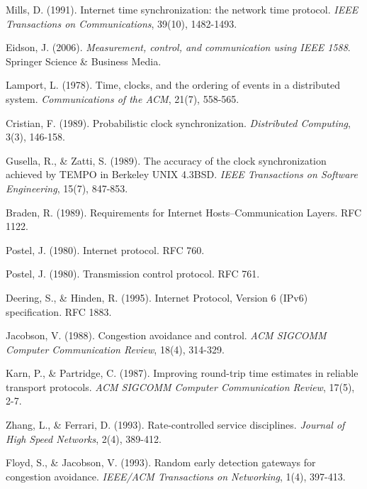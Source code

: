 \documentclass[12pt,a4paper]{article}
\begin{document}

\begin{thebibliography}{99}

Mills, D. (1991). Internet time synchronization: the network time protocol. \textit{IEEE Transactions on Communications}, 39(10), 1482-1493.

Eidson, J. (2006). \textit{Measurement, control, and communication using IEEE 1588}. Springer Science \& Business Media.

Lamport, L. (1978). Time, clocks, and the ordering of events in a distributed system. \textit{Communications of the ACM}, 21(7), 558-565.

Cristian, F. (1989). Probabilistic clock synchronization. \textit{Distributed Computing}, 3(3), 146-158.

Gusella, R., \& Zatti, S. (1989). The accuracy of the clock synchronization achieved by TEMPO in Berkeley UNIX 4.3BSD. \textit{IEEE Transactions on Software Engineering}, 15(7), 847-853.

Braden, R. (1989). Requirements for Internet Hosts--Communication Layers. RFC 1122.

Postel, J. (1980). Internet protocol. RFC 760.

Postel, J. (1980). Transmission control protocol. RFC 761.

Deering, S., \& Hinden, R. (1995). Internet Protocol, Version 6 (IPv6) specification. RFC 1883.

Jacobson, V. (1988). Congestion avoidance and control. \textit{ACM SIGCOMM Computer Communication Review}, 18(4), 314-329.

Karn, P., \& Partridge, C. (1987). Improving round-trip time estimates in reliable transport protocols. \textit{ACM SIGCOMM Computer Communication Review}, 17(5), 2-7.

Zhang, L., \& Ferrari, D. (1993). Rate-controlled service disciplines. \textit{Journal of High Speed Networks}, 2(4), 389-412.

Floyd, S., \& Jacobson, V. (1993). Random early detection gateways for congestion avoidance. \textit{IEEE/ACM Transactions on Networking}, 1(4), 397-413.


\end{thebibliography}
\end{document}
